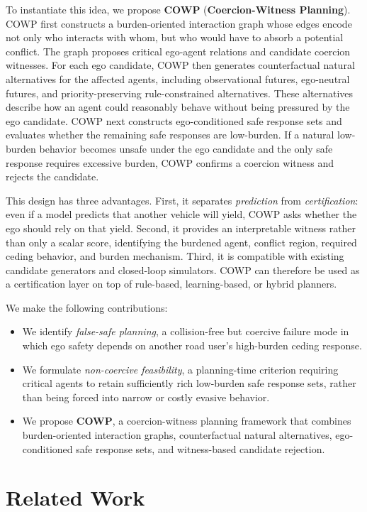 \documentclass[10pt]{article}
\begin{document}
To instantiate this idea, we propose \textbf{COWP} (\textbf{Coercion-Witness Planning}). COWP first constructs a burden-oriented interaction graph whose edges encode not only who interacts with whom, but who would have to absorb a potential conflict. The graph proposes critical ego-agent relations and candidate coercion witnesses. For each ego candidate, COWP then generates counterfactual natural alternatives for the affected agents, including observational futures, ego-neutral futures, and priority-preserving rule-constrained alternatives. These alternatives describe how an agent could reasonably behave without being pressured by the ego candidate. COWP next constructs ego-conditioned safe response sets and evaluates whether the remaining safe responses are low-burden. If a natural low-burden behavior becomes unsafe under the ego candidate and the only safe response requires excessive burden, COWP confirms a coercion witness and rejects the candidate. 

This design has three advantages. First, it separates \emph{prediction} from \emph{certification}: even if a model predicts that another vehicle will yield, COWP asks whether the ego should rely on that yield. Second, it provides an interpretable witness rather than only a scalar score, identifying the burdened agent, conflict region, required ceding behavior, and burden mechanism. Third, it is compatible with existing candidate generators and closed-loop simulators. COWP can therefore be used as a certification layer on top of rule-based, learning-based, or hybrid planners.

We make the following contributions: \begin{itemize} 
\item We identify \emph{false-safe planning}, a collision-free but coercive failure mode in which ego safety depends on another road user's high-burden ceding response. 
\item We formulate \emph{non-coercive feasibility}, a planning-time criterion requiring critical agents to retain sufficiently rich low-burden safe response sets, rather than being forced into narrow or costly evasive behavior. 
\item We propose \textbf{COWP}, a coercion-witness planning framework that combines burden-oriented interaction graphs, counterfactual natural alternatives, ego-conditioned safe response sets, and witness-based candidate rejection. \end{itemize}


\section{Related Work}
\end{document}

